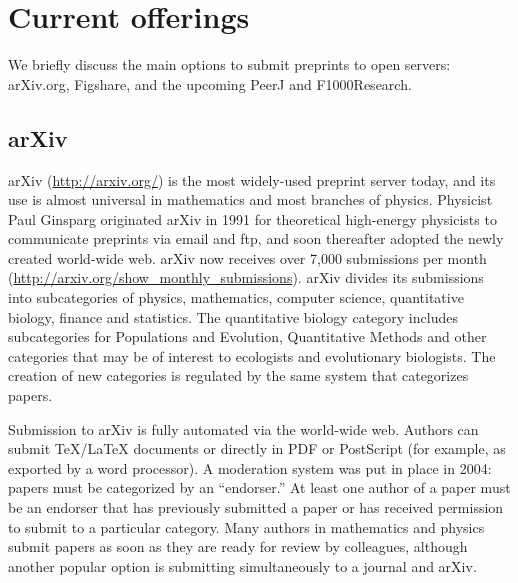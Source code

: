 \documentclass[letterpaper,twocolumn,superscriptaddress,showkeys]{revtex4}
\begin{document}
\section{Current offerings}

We briefly discuss the main options to submit preprints to open servers:
arXiv.org, Figshare, and the upcoming PeerJ and F1000Research.

\subsection{arXiv}

%

arXiv (\url{http://arxiv.org/}) is the most widely-used preprint
server today, and its use is almost universal in mathematics and most
branches of physics.  Physicist Paul Ginsparg originated arXiv in 1991
for theoretical high-energy physicists to communicate preprints via
email and ftp, and soon thereafter adopted the newly created
world-wide web\cite{jackson2002preprints}.  arXiv now receives over
7,000 submissions per month
(\url{http://arxiv.org/show_monthly_submissions}).  arXiv divides its
submissions into subcategories of physics, mathematics, computer
science, quantitative biology, finance and statistics.  The
quantitative biology category includes subcategories for Populations
and Evolution, Quantitative Methods and other categories that may be
of interest to ecologists and evolutionary biologists.
The creation of new categories is regulated by the same system that
categorizes papers.

Submission to arXiv is fully automated via the world-wide web.
Authors can submit \TeX{}/\LaTeX{} documents or directly in PDF or
PostScript (for example, as exported by a word processor).  A
moderation system was put in place in 2004: papers must be categorized
by an ``endorser.''  At least one author of a paper must be an
endorser that has previously submitted a paper or has received
permission to submit to a particular category.  Many authors in
mathematics and physics submit papers as soon as they are ready for
review by colleagues, although another popular option is submitting
simultaneously to a journal and arXiv.
\end{document}
